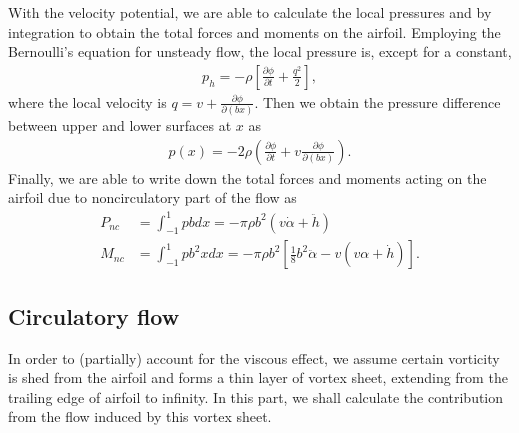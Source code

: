 With the velocity potential, we are able to calculate the local pressures and by integration to obtain the total forces and moments on the airfoil.
Employing the Bernoulli's equation for unsteady flow, the local pressure is, except for a constant,
\begin{align}
p_h = -\rho[\frac{\partial \phi}{\partial t} + \frac{q^2}{2}],
\end{align} 
where the local velocity is $q = v+\frac{\partial \phi}{\partial (bx)}$. Then we obtain the pressure difference between upper and lower surfaces at $x$ as
\begin{align}
p(x) = -2\rho(\frac{\partial \phi}{\partial t} + v\frac{\partial \phi}{\partial (bx)}).
\end{align} 
Finally, we are able to write down the total forces and moments acting on the airfoil due to noncirculatory part of the flow as
\begin{align}
P_{nc} & = \int^{1}_{-1}pbdx
   = -\pi\rho b^2(v\dot{\alpha} + \ddot{h})   \\
M_{nc} & = \int^{1}_{-1}pb^2xdx
   = -\pi\rho b^2[\frac{1}{8}b^2\ddot{\alpha}-v(v\alpha + \dot{h})].
\end{align}


\subsection{Circulatory flow}

In order to (partially) account for the viscous effect, we assume certain vorticity is shed from the airfoil and forms a thin layer of vortex sheet, extending from the trailing edge of airfoil to infinity.
In this part, we shall calculate the contribution from the flow induced by this vortex sheet.

